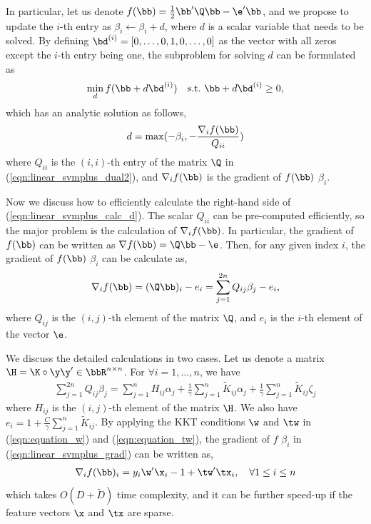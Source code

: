 In particular, let us denote $f(\bb) = \frac{1}{2}\bb'\Q\bb -\e'\bb$, and we propose to update the $i$-th entry as $\beta_i\leftarrow \beta_i + d$, where $d$ is a scalar variable that needs to be solved. By defining $\bd^{(i)} = [0, \ldots, 0, 1, 0, \ldots, 0]$ as the vector with all zeros except the $i$-th entry being one, the subproblem for solving $d$ can be formulated as
\begin{eqnarray}
\min_{d} f(\bb + d\bd^{(i)}) \quad \mbox{s.t.}\,\,\bb +  d\bd^{(i)} \geq 0,\label{eqn:linear_svmplus_sub}
\end{eqnarray}
which has an analytic solution as follows,
\begin{eqnarray}
d = \max(- \beta_i, - \frac{\nabla_i f(\bb)}{Q_{ii}}) \label{eqn:linear_svmplus_calc_d}
\end{eqnarray}
where $Q_{ii}$ is the $(i, i)$-th entry of the matrix $\Q$ in (\ref{eqn:linear_svmplus_dual2}), and $\nabla_if(\bb)$ is the gradient of $f(\bb)$ \wrt $\beta_i$.

Now we discuss how to efficiently calculate the right-hand side of (\ref{eqn:linear_svmplus_calc_d}). The scalar $Q_{ii}$ can be pre-computed efficiently, so the major problem is the calculation of $\nabla_i f(\bb)$. In particular, the gradient of $f(\bb)$ can be written as $\nabla f(\bb) = \Q\bb - \e$. Then, for any given index $i$, the gradient of $f(\bb)$ \wrt $\beta_i$ can be calculate as,
\begin{eqnarray}\label{eqn:linear_svmplus_grad}
\nabla_if(\bb) = (\Q\bb)_i - e_i = \sum_{j=1}^{2n}Q_{ij}\beta_j - e_i,
\end{eqnarray}
where $Q_{ij}$ is the $(i, j)$-th element of the matrix $\Q$, and $e_i$ is the $i$-th element of the vector $\e$.

We discuss the detailed calculations in two cases. Let us denote a matrix $\H = \K\circ\y\y' \in \bbR^{n\times n}$. For $\forall i = 1,\ldots, n$, we have
\begin{eqnarray}
\sum_{j=1}^{2n}Q_{ij}\beta_j = \sum_{j=1}^nH_{ij}\alpha_j + \frac{1}{\gamma}\sum_{j=1}^n\tilde{K}_{ij}\alpha_j + \frac{1}{\gamma}\sum_{j=1}^n\tilde{K}_{ij}\zeta_j\nonumber
\end{eqnarray}
where $H_{ij}$ is the $(i,j)$-th element of the matrix $\H$. We also have $e_i = 1 +\frac{C}{\gamma}\sum_{j=1}^n\tilde{K}_{ij}$. By applying the KKT conditions \wrt $\w$ and $\tw$ in (\ref{eqn:equation_w}) and (\ref{eqn:equation_tw}), the gradient of $f$ \wrt $\beta_i$ in (\ref{eqn:linear_svmplus_grad}) can be written as,
\begin{eqnarray}\label{eqn:linear_svmplus_grad_01}
\nabla_if(\bb)_i = y_i\w'\x_i - 1  + \tw'\tx_i, \quad \forall 1\leq i \leq n
\end{eqnarray}
which takes $O(D+\tilde{D})$ time complexity, and it can be further speed-up if the feature vectors $\x$ and $\tx$ are sparse.


